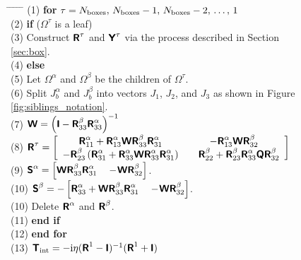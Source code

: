 \documentclass[11pt,final]{amsart}
\theoremstyle{definition}
\numberwithin{remark}{section}
\numberwithin{definition}{section}
\numberwithin{pro}{section}
\begin{document}
\begin{figure}[ht]
{\begin{minipage}{140mm}
\begin{tabbing}
\mbox{}\hspace{7mm} \= \mbox{}\hspace{6mm} \= \mbox{}\hspace{6mm} \= \mbox{}\hspace{6mm} \= \mbox{}\hspace{6mm} \= \kill
(1)\> \textbf{for} $\tau = N_{\rm boxes},\,N_{\rm boxes}-1,\,N_{\rm boxes}-2,\,\dots,\,1$\\
(2)\> \> \textbf{if} ($\Omega^\tau$ is a leaf)\\
(3)\> \> \> Construct $\bm{\mathsf{R}}^{\tau}$ and $\bm{\mathsf{Y}}^\tau$ via the process described in Section \ref{sec:box}.\\
(4)\> \> \textbf{else}\\
(5)\> \> \> Let $\Omega^\alpha$ and $\Omega^\beta$ be the children of $\Omega^\tau$.\\
(6)\> \> \> Split $J_b^{\alpha}$ and $J_b^{\beta}$ into vectors $J_{1}$, $J_{2}$, and $J_{3}$ as shown in Figure \ref{fig:siblings_notation}.\\
(7)\> \> \> $\bm{\mathsf{W}} = \left(\bm{\mathsf{I}}-{\bm{\mathsf{R}}^{\beta}_{33}}\bm{\mathsf{R}}^{\alpha}_{33}\right)^{-1}$\\
(8)\> \> \> $\bm{\mathsf{R}}^\tau = \left[\begin{array}{cc} {\bm{\mathsf{R}}^{\alpha}_{11}}+{\bm{\mathsf{R}}^{\alpha}_{13}}\bm{\mathsf{W}}\bm{\mathsf{R}}^{\beta}_{33}\bm{\mathsf{R}}^{\alpha}_{31} & -{\bm{\mathsf{R}}^{\alpha}_{13}}\bm{\mathsf{W}}{\bm{\mathsf{R}}^{\beta}_{32}} \\ -\bm{\mathsf{R}}_{23}^{\beta}\left(\bm{\mathsf{R}}^{\alpha}_{31}+\bm{\mathsf{R}}^{\alpha}_{33}\bm{\mathsf{W}}\bm{\mathsf{R}}^{\alpha}_{33}\bm{\mathsf{R}}_{31}^{\alpha}\right) & \quad\bm{\mathsf{R}}^{\beta}_{22}+\bm{\mathsf{R}}_{23}^{\beta}\bm{\mathsf{R}}^{\alpha}_{33}\bm{\mathsf{Q}}\bm{\mathsf{R}}_{32}^{\beta} \end{array}\right]$\\
(9)\> \> \> $\bm{\mathsf{S}}^{\alpha} =  \left[\bm{\mathsf{W}}\bm{\mathsf{R}}^{\beta}_{33}\bm{\mathsf{R}}^{\alpha}_{31}\quad -\!\bm{\mathsf{W}} {\bm{\mathsf{R}}^{\beta}_{32}}\right]$.\\
(10)\> \> \> $\bm{\mathsf{S}}^{\beta} = -\left[\bm{\mathsf{R}}^{\alpha}_{33}+\bm{\mathsf{W}}\bm{\mathsf{R}}^{\beta}_{33}\bm{\mathsf{R}}^{\alpha}_{31}\quad -\!\bm{\mathsf{W}} {\bm{\mathsf{R}}^{\beta}_{32}}\right]$.\\
(10)\> \> \> Delete $\bm{\mathsf{R}}^{\alpha}$ and $\bm{\mathsf{R}}^{\beta}$.\\
(11)\> \> \textbf{end if}\\
(12)\> \textbf{end for}\\
(13)\> $\bm{\mathsf{T}}_{\rm int} = -{\rm i}\eta(\bm{\mathsf{R}}^1-\bm{\mathsf{I}})^{-1}(\bm{\mathsf{R}}^1+\bm{\mathsf{I}})$
\end{tabbing}
\end{minipage}}
\end{figure}
\end{document}
